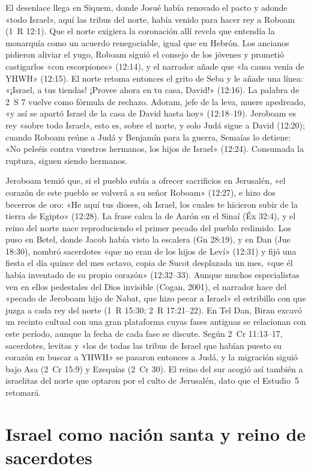 El desenlace llega en Siquem, donde Josué había renovado el pacto y adonde «todo Israel», aquí las tribus del norte, había venido para hacer rey a Roboam (1~R 12:1). Que el norte exigiera la coronación allí revela que entendía la monarquía como un acuerdo renegociable, igual que en Hebrón. Los ancianos pidieron aliviar el yugo, Roboam siguió el consejo de los jóvenes y prometió castigarlos «con escorpiones» (12:14), y el narrador añade que «la causa venía de YHWH» (12:15). El norte retoma entonces el grito de Seba y le añade una línea: «¡Israel, a tus tiendas! ¡Provee ahora en tu casa, David!» (12:16). La palabra de 2~S 7 vuelve como fórmula de rechazo. Adoram, jefe de la leva, muere apedreado, «y así se apartó Israel de la casa de David hasta hoy» (12:18--19). Jeroboam es rey «sobre todo Israel», esto es, sobre el norte, y solo Judá sigue a David (12:20); cuando Roboam reúne a Judá y Benjamín para la guerra, Semaías lo detiene: «No peleéis contra vuestros hermanos, los hijos de Israel» (12:24). Consumada la ruptura, siguen siendo hermanos.

Jeroboam temió que, si el pueblo subía a ofrecer sacrificios en Jerusalén, «el corazón de este pueblo se volverá a su señor Roboam» (12:27), e hizo dos becerros de oro: «He aquí tus dioses, oh Israel, los cuales te hicieron subir de la tierra de Egipto» (12:28). La frase calca la de Aarón en el Sinaí (Éx 32:4), y el reino del norte nace reproduciendo el primer pecado del pueblo redimido. Los puso en Betel, donde Jacob había visto la escalera (Gn 28:19), y en Dan (Jue 18:30), nombró sacerdotes «que no eran de los hijos de Leví» (12:31) y fijó una fiesta el día quince del mes octavo, copia de Sucot desplazada un mes, «que él había inventado de su propio corazón» (12:32--33). Aunque muchos especialistas ven en ellos pedestales del Dios invisible (Cogan, 2001), el narrador hace del «pecado de Jeroboam hijo de Nabat, que hizo pecar a Israel» el estribillo con que juzga a cada rey del norte (1~R 15:30; 2~R 17:21--22). En Tel Dan, Biran excavó un recinto cultual con una gran plataforma cuyas fases antiguas se relacionan con este período, aunque la fecha de cada fase se discute. Según 2~Cr 11:13--17, sacerdotes, levitas y «los de todas las tribus de Israel que habían puesto su corazón en buscar a YHWH» se pasaron entonces a Judá, y la migración siguió bajo Asa (2~Cr 15:9) y Ezequías (2~Cr 30). El reino del sur acogió así también a israelitas del norte que optaron por el culto de Jerusalén, dato que el Estudio~5 retomará.

\section{Israel como nación santa y reino de sacerdotes}

